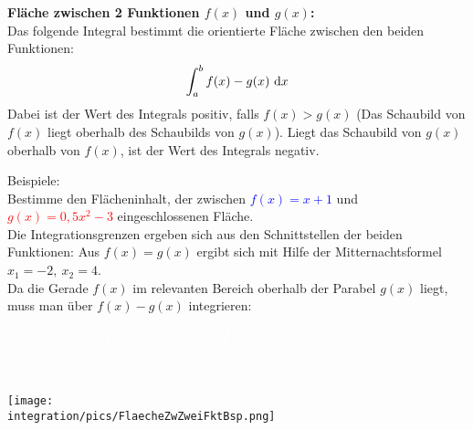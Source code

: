 \begin{tcolorbox}
	\textbf{Fläche zwischen 2 Funktionen \(f(x)\) und \(g(x)\):}\\
	\textcolor{loestc}{Das folgende Integral bestimmt die orientierte Fläche zwischen den beiden Funktionen:
		\[\int_a^b f(x)-g(x) \ \text{d} x\]
		Dabei ist der Wert des Integrals positiv, falls \(f(x)>g(x)\) (Das Schaubild von \(f(x)\) liegt oberhalb des Schaubilds von \(g(x)\)). Liegt das Schaubild von \(g(x)\) oberhalb von \(f(x)\), ist der Wert des Integrals negativ.
	}
\end{tcolorbox}
\begin{minipage}{\textwidth}
	\begin{minipage}{.6\textwidth}\raggedright
		Beispiele:\\
		Bestimme den Flächeninhalt, der zwischen \textcolor{blue}{\(f(x)=x+1\)} und \textcolor{red}{\(g(x)=0,5x^2-3\)} eingeschlossenen Fläche.\\
		\textcolor{loes}{Die Integrationsgrenzen ergeben sich aus den Schnittstellen der beiden Funktionen:}
		\textcolor{loes}{Aus \(f(x)=g(x)\) ergibt sich mit Hilfe der Mitternachtsformel \(x_1=-2,\ x_2=4\)}.\\
		\textcolor{loes}{Da die Gerade \(f(x)\) im relevanten Bereich oberhalb der Parabel \(g(x)\) liegt, muss man über \(f(x)-g(x)\) integrieren:}
		\begin{align*}
			\textcolor{loes}{\int_{-2}^4 f(x)-g(x) \td x}&\textcolor{loes}{=\int_{-2}^4 x+1-\left(0,5x^2-3\right) \td x}\\
			&\textcolor{loes}{=\left[-\tfrac{1}{6}x^3+\tfrac{1}{2}x^2+4x\right]_{-2}^4=18}
		\end{align*}
	\end{minipage}
	\begin{minipage}{.4\textwidth}
		\texttt{[image: \\integration/pics/FlaecheZwZweiFktBsp.png]}
	\end{minipage}
\end{minipage}\vspace{\baselineskip}\\
